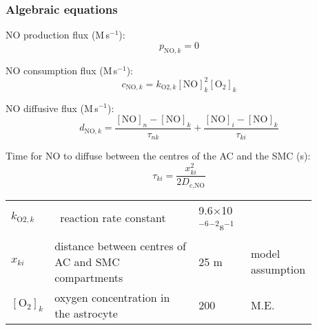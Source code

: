 \documentclass[fleqn]{report}
\numberwithin{equation}{section}
\numberwithin{equation}{section}
\newcommand{\NO}{\text{NO}}
\newcommand{\Otwo}{\text{O$_2$}}
\newcommand{\uMpers}{\textmu M\,s$^{-1}$}
\newcommand\e[1]{$\times$10$^{#1}$}
\newcommand{\n}{$^{-1}$}
\newcommand\pNO[1]{\text{$p_{\text{NO},#1}$}}
\newcommand\cNO[1]{\text{$c_{\text{NO},#1}$}}
\newcommand\dNO[1]{\text{$d_{\text{NO},#1}$}}
\begin{document}
			\subsubsection*{Algebraic equations}
				NO production flux (\uMpers):
				\begin{equation} 
					\pNO{k} = 0
				\end{equation}
			
				NO consumption flux (\uMpers):
				\begin{equation} 
					\cNO{k} = k_{\text{O2},k} [\NO]_k^2 [\Otwo]_k
				\end{equation}
					
				NO diffusive flux (\uMpers):
				\begin{equation} 
					\dNO{k} = \frac{[\NO]_n - [\NO]_k}{\tau_{nk}} + \frac{[\NO]_i - [\NO]_k}{\tau_{ki}}
				\end{equation}	
					
				Time for NO to diffuse between the centres of the AC and the SMC (s):
				\begin{equation}
					\tau_{ki} = \frac{x_{ki}^2}{2 D_{\text{c,NO}}}
				\end{equation}
				
				\begin{table}[h!]
					\centering
					\begin{tabular}{ p{0.07\linewidth}  >{\footnotesize} p{0.47\linewidth}  >{\footnotesize} p{0.17\linewidth} >{\footnotesize} p{0.17\linewidth} }
						\hline
						$ k_{\text{O2},k} $ 	& \Otwo\ reaction rate constant							& 9.6\e{-6}\uM$^{-2}$s\n 	& \citep{Kavdia2002} \\ %
						$ x_{ki} $ 				& distance between centres of AC and SMC compartments 	& 25 \textmu m 				& model assumption \\ 
						$[\Otwo]_k$    & oxygen concentration in the astrocyte & 200 \uM 			& M.E. \\
						\hline
					\end{tabular}
				\end{table}
				
				
\end{document}
